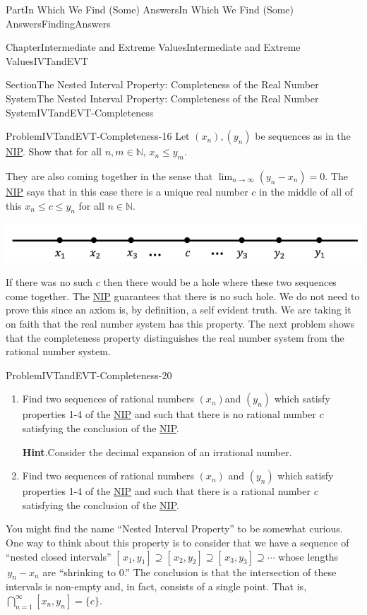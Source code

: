 \documentclass[oneside,10pt,]{book}
\newcommand{\blocktitlefont}{\relax}
\numberwithin{equation}{part}
\newcommand{\NN}{\mathbb {N}}
\begin{document}
\begin{partptx}{Part}{In Which We Find (Some) Answers}{}{In Which We Find (Some) Answers}{}{}{FindingAnswers}
\begin{chapterptx}{Chapter}{Intermediate and Extreme Values}{}{Intermediate and Extreme Values}{}{}{IVTandEVT}
\begin{sectionptx}{Section}{The Nested Interval Property: Completeness of the Real Number System}{}{The Nested Interval Property: Completeness of the Real Number System}{}{}{IVTandEVT-Completeness}
\begin{problem}{Problem}{}{IVTandEVT-Completeness-16}
Let \((x_n), (y_n)\) be sequences as in the \hyperref[NIP]{NIP}. Show that for all \(n, m \in\NN\), \(x_n\le y_m\).%
\end{problem}
They are also coming together in the sense that \(\lim_{n\rightarrow\infty}\left(y_n-x_n\right)=0\).  The \hyperref[NIP]{NIP} says that in this case there is a unique real number \(c\) in the middle of all of this \(x_n\leq c\leq y_n\) for all \(n\in\NN\).%
\begin{image}{0.125}{0.75}{0.125}{}%
\includegraphics[width=\linewidth]{external/images/Ch6fig4.png}
\end{image}%
If there was no such \(c\) then there would be a hole where these two sequences come together.  The \hyperref[NIP]{NIP} guarantees that there is no such hole. We do not need to prove this since an axiom is, by definition, a self evident truth.  We are taking it on faith that the real number system has this property.  The next problem shows that the completeness property distinguishes the real number system from the rational number system.%
\begin{problem}{Problem}{}{IVTandEVT-Completeness-20}%
\begin{enumerate}[font=\bfseries,label=(\alph*),ref=\alph*]%
\item{}Find two sequences of rational numbers \(\left(x_n\right)\)and \(\left(y_n\right)\) which satisfy properties 1-4 of the \hyperref[NIP]{NIP}  and such that there is no rational number \(c\) satisfying the conclusion of the \hyperref[NIP]{NIP}.%
\par\smallskip%
\noindent\textbf{\blocktitlefont Hint}.\hypertarget{IVTandEVT-Completeness-20-2-2}{}\quad{}Consider the decimal expansion of an irrational number.%
\item{}Find two sequences of rational numbers \(\left(x_n\right)\) and \(\left(y_n\right)\) which satisfy properties 1-4 of the \hyperref[NIP]{NIP}  and such that there is a rational number \(c\) satisfying the conclusion of the \hyperref[NIP]{NIP}.%
\end{enumerate}%
\end{problem}
You might find the name ``Nested Interval Property'' to be somewhat curious.  One way to think about this property is to consider that we have a sequence of ``nested closed intervals'' \([\,x_1,y_1]\supseteq[\,x_2,y_2]\supseteq[\,x_3,y_3]\supseteq\cdots\) whose lengths \(\,y_n-x_n\) are ``shrinking to \(0\).'' The conclusion is that the intersection of these intervals is non-empty and, in fact, consists of a single point.  That is, \(\bigcap_{n=1}^\infty[x_n,y_n]=\{c\}\).%

\end{sectionptx}
\end{chapterptx}
\end{partptx}
\end{document}
